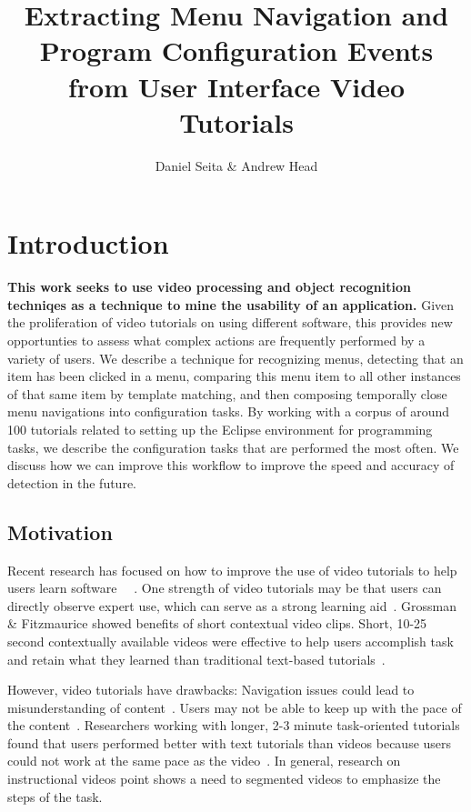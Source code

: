 \documentclass[12pt]{memoir}
\title{Extracting Menu Navigation and Program Configuration Events 
from User Interface Video Tutorials}
\author{Daniel Seita \& Andrew Head}
\begin{document}
\maketitle

\section{Introduction}

\textbf{This work seeks to use video processing and object recognition techniqes as
a technique to mine the usability of an application.}  Given the proliferation
of video tutorials on using different software, this provides new opportunties
to assess what complex actions are frequently performed by a variety of users.
We describe a technique for recognizing menus, detecting that an item has
been clicked in a menu, comparing this menu item to all other instances of
that same item by template matching, and then composing temporally close
menu navigations into configuration tasks.  By working with a corpus of
around 100 tutorials related to setting up the Eclipse environment for
programming tasks, we describe the configuration tasks that are performed
the most often.  We discuss how we can improve this workflow to improve the
speed and accuracy of detection in the future.

\subsection{Motivation}

Recent research has focused on how to improve the use of video tutorials 
to help users learn software ~\cite{matejka_ambient_2011}~\cite{pongnumkul_pause-and-play_2011}.  
One strength of video tutorials may be that users
can directly observe expert use, which can serve as a strong learning aid~\cite{shneiderman_direct_1983}.  Grossman \& Fitzmaurice showed benefits of short 
contextual video clips.  Short, 10-25 second 
contextually available videos were effective to help users accomplish task and 
retain what they learned than traditional text-based tutorials~\cite{grossman_toolclips_2010}.

However, video tutorials have drawbacks:
Navigation issues could lead to misunderstanding of content~\cite{harrison_comparison_1995}.
Users may not be able to keep up with the pace of the content~\cite{palmiter_evaluation_1991}.
Researchers working with longer, 2-3 minute 
task-oriented tutorials found that users performed better with text tutorials 
than videos because users could not work at the same pace as the video~\cite{grabler_generating_2009}.
In general, research on instructional videos point shows a need to segmented videos to
emphasize the steps of the task.
\end{document}
